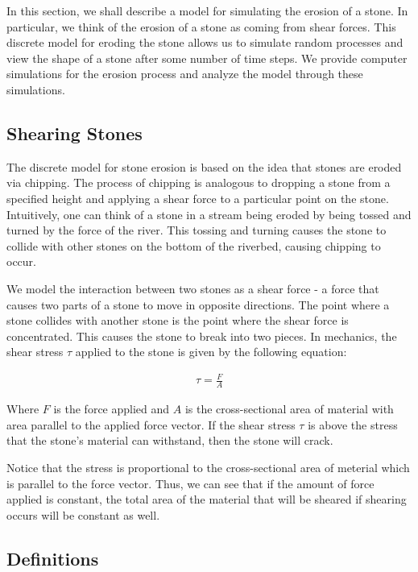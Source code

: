 In this section, we shall describe a model for simulating the erosion of a stone. In particular, we think of the erosion of a stone as coming from shear forces. This discrete model for eroding the stone allows us to simulate random processes and view the shape of a stone after some number of time steps. We provide computer simulations for the erosion process and analyze the model through these simulations.

\subsection{Shearing Stones}

The discrete model for stone erosion is based on the idea that stones are eroded via chipping. The process of chipping is analogous to dropping a stone from a specified height and applying a shear force to a particular point on the stone. Intuitively, one can think of a stone in a stream being eroded by being tossed and turned by the force of the river. This tossing and turning causes the stone to collide with other stones on the bottom of the riverbed, causing chipping to occur.

We model the interaction between two stones as a shear force - a force that causes two parts of a stone to move in opposite directions. The point where a stone collides with another stone is the point where the shear force is concentrated. This causes the stone to break into two pieces. In mechanics, the shear stress $\tau$ applied to the stone is given by the following equation:

\begin{eqnarray}
  \tau = \frac{F}{A}
\end{eqnarray}

Where $F$ is the force applied and $A$ is the cross-sectional area of material with area parallel to the applied force vector. If the shear stress $\tau$ is above the stress that the stone's material can withstand, then the stone will crack.

Notice that the stress is proportional to the cross-sectional area of meterial which is parallel to the force vector. Thus, we can see that if the amount of force applied is constant, the total area of the material that will be sheared if shearing occurs will be constant as well.

\subsection{Definitions}

